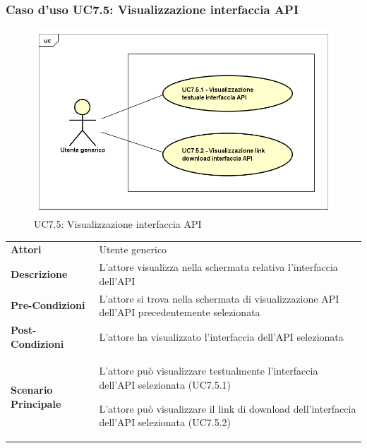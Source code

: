 \newpage
\subsubsection{Caso d'uso UC7.5: Visualizzazione interfaccia API}
\label{UC7_5}
\begin{figure}[ht]
	\centering
	\includegraphics[scale=0.45]{UML/UC7_5.png}
	\caption{UC7.5: Visualizzazione interfaccia API}
\end{figure}

\begin{minipage}{\linewidth}
	\begin{tabular}{ l | p{11cm}}
		\hline
		\rowcolor{Gray}
		\multicolumn{2}{c}{UC7.5 - Visualizzazione interfaccia API} \\
		\hline
		\textbf{Attori} & Utente generico \\
		\textbf{Descrizione} & L'attore visualizza nella schermata relativa l'interfaccia dell'API \\
		\textbf{Pre-Condizioni} & L'attore si trova nella schermata di visualizzazione API dell'API precedentemente selezionata \\
		\textbf{Post-Condizioni} & L'attore ha visualizzato l'interfaccia dell'API selezionata \\
		\textbf{Scenario Principale} & 
		\begin{enumerate*}[label=(\arabic*.),itemjoin={\newline}]
			\item L'attore può visualizzare testualmente l'interfaccia dell'API selezionata (UC7.5.1)
			\item L'attore può visualizzare il link di download dell'interfaccia dell'API selezionata (UC7.5.2)
		\end{enumerate*}\\
	\end{tabular}
\end{minipage}

